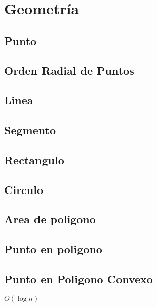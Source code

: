 \newpage
\section{Geometr\'ia}

\subsection{Punto}


\subsection{Orden Radial de Puntos}


\subsection{Linea}


\subsection{Segmento}


\subsection{Rectangulo}


\subsection{Circulo}


\subsection{Area de poligono}


\subsection{Punto en poligono}


\subsection{Punto en Poligono Convexo}
$O(\log{n})$


